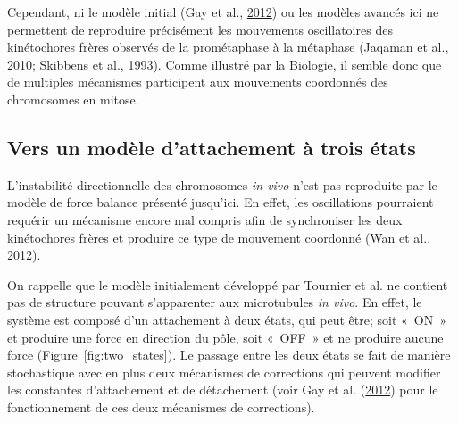 \documentclass[12pt,a4paper,twoside,openright]{book}
\begin{document}
Cependant, ni le modèle initial (Gay et al.,
\protect\hyperlink{ref-Gay2012a}{2012}) ou les modèles avancés ici ne
permettent de reproduire précisément les mouvements oscillatoires des
kinétochores frères observés de la prométaphase à la métaphase (Jaqaman
et al., \protect\hyperlink{ref-Jaqaman2010}{2010}; Skibbens et al.,
\protect\hyperlink{ref-Skibbens1993}{1993}). Comme illustré par la
Biologie, il semble donc que de multiples mécanismes participent aux
mouvements coordonnés des chromosomes en mitose.

\subsection{Vers un modèle d'attachement à trois
états}\label{vers-un-moduxe8le-dattachement-uxe0-trois-uxe9tats}

\label{sec:three-state}

L'instabilité directionnelle des chromosomes \emph{in vivo} n'est pas
reproduite par le modèle de force balance présenté jusqu'ici. En effet,
les oscillations pourraient requérir un mécanisme encore mal compris
afin de synchroniser les deux kinétochores frères et produire ce type de
mouvement coordonné (Wan et al., \protect\hyperlink{ref-Wan2012}{2012}).

On rappelle que le modèle initialement développé par Tournier et al. ne
contient pas de structure pouvant s'apparenter aux microtubules \emph{in
vivo}. En effet, le système est composé d'un attachement à deux états,
qui peut être; soit «~ON~» et produire une force en direction du pôle,
soit «~OFF~» et ne produire aucune force (Figure~\ref{fig:two_states}).
Le passage entre les deux états se fait de manière stochastique avec en
plus deux mécanismes de corrections qui peuvent modifier les constantes
d'attachement et de détachement (voir Gay et al.
(\protect\hyperlink{ref-Gay2012a}{2012}) pour le fonctionnement de ces
deux mécanismes de corrections).
\end{document}
